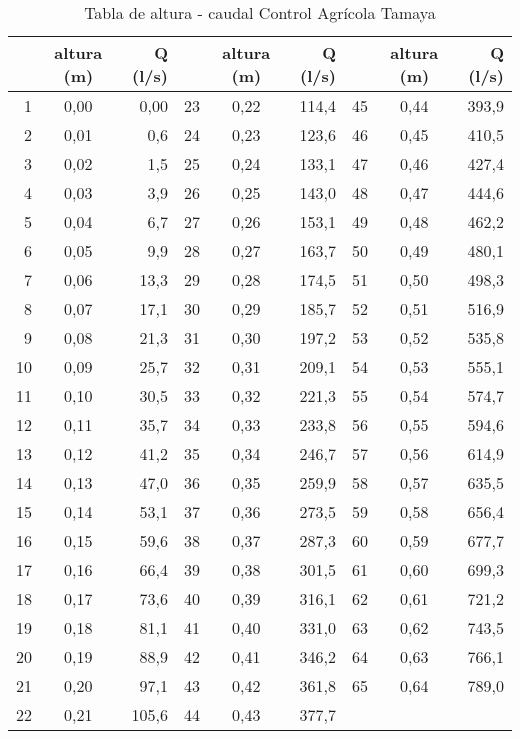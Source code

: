 \documentclass[]{article}
\begin{document}
\begin{table}[H]

\caption{Tabla de altura - caudal Control Agrícola Tamaya}
\centering

\begin{center}
\begingroup\fontsize{10pt}{11pt}\selectfont
\begin{tabular}{rcrrcrrcr}
  \hline
 & altura (m) & Q (l/s) &  & altura (m) & Q (l/s) &  & altura (m) & Q (l/s) \\ 
  \hline
  1 & 0,00 & 0,00 &  23 & 0,22 & 114,4 &  45 & 0,44 & 393,9 \\ 
    2 & 0,01 & 0,6 &  24 & 0,23 & 123,6 &  46 & 0,45 & 410,5 \\ 
    3 & 0,02 & 1,5 &  25 & 0,24 & 133,1 &  47 & 0,46 & 427,4 \\ 
    4 & 0,03 & 3,9 &  26 & 0,25 & 143,0 &  48 & 0,47 & 444,6 \\ 
    5 & 0,04 & 6,7 &  27 & 0,26 & 153,1 &  49 & 0,48 & 462,2 \\ 
    6 & 0,05 & 9,9 &  28 & 0,27 & 163,7 &  50 & 0,49 & 480,1 \\ 
    7 & 0,06 & 13,3 &  29 & 0,28 & 174,5 &  51 & 0,50 & 498,3 \\ 
    8 & 0,07 & 17,1 &  30 & 0,29 & 185,7 &  52 & 0,51 & 516,9 \\ 
    9 & 0,08 & 21,3 &  31 & 0,30 & 197,2 &  53 & 0,52 & 535,8 \\ 
   10 & 0,09 & 25,7 &  32 & 0,31 & 209,1 &  54 & 0,53 & 555,1 \\ 
   11 & 0,10 & 30,5 &  33 & 0,32 & 221,3 &  55 & 0,54 & 574,7 \\ 
   12 & 0,11 & 35,7 &  34 & 0,33 & 233,8 &  56 & 0,55 & 594,6 \\ 
   13 & 0,12 & 41,2 &  35 & 0,34 & 246,7 &  57 & 0,56 & 614,9 \\ 
   14 & 0,13 & 47,0 &  36 & 0,35 & 259,9 &  58 & 0,57 & 635,5 \\ 
   15 & 0,14 & 53,1 &  37 & 0,36 & 273,5 &  59 & 0,58 & 656,4 \\ 
   16 & 0,15 & 59,6 &  38 & 0,37 & 287,3 &  60 & 0,59 & 677,7 \\ 
   17 & 0,16 & 66,4 &  39 & 0,38 & 301,5 &  61 & 0,60 & 699,3 \\ 
   18 & 0,17 & 73,6 &  40 & 0,39 & 316,1 &  62 & 0,61 & 721,2 \\ 
   19 & 0,18 & 81,1 &  41 & 0,40 & 331,0 &  63 & 0,62 & 743,5 \\ 
   20 & 0,19 & 88,9 &  42 & 0,41 & 346,2 &  64 & 0,63 & 766,1 \\ 
   21 & 0,20 & 97,1 &  43 & 0,42 & 361,8 &  65 & 0,64 & 789,0 \\ 
   22 & 0,21 & 105,6 &  44 & 0,43 & 377,7 &  &  &  \\ 
   \hline
\end{tabular}
\endgroup\end{center}
\end{table}
\end{document}
